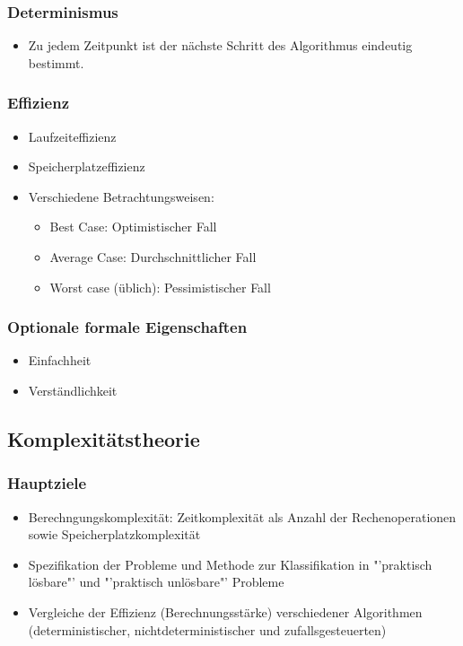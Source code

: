 \subsubsection{Determinismus}
    \begin{itemize}
	    \item Zu jedem Zeitpunkt ist der nächste Schritt des Algorithmus eindeutig bestimmt.
    \end{itemize}
\subsubsection{Effizienz}
    \begin{itemize}
	    \item Laufzeiteffizienz
	    \item Speicherplatzeffizienz
	    \item Verschiedene Betrachtungsweisen:
	    \begin{itemize}
	        \item Best Case: Optimistischer Fall
	        \item Average Case: Durchschnittlicher Fall
	        \item Worst case (üblich): Pessimistischer Fall
	    \end{itemize}
    \end{itemize}
\subsubsection{Optionale formale Eigenschaften}
    \begin{itemize}
	    \item Einfachheit
	    \item Verständlichkeit
    \end{itemize}


\subsection{Komplexitätstheorie}
\subsubsection{Hauptziele}
    \begin{itemize}
        \item Berechngungskomplexität: Zeitkomplexität als Anzahl der Rechenoperationen sowie Speicherplatzkomplexität
        \item Spezifikation der Probleme und Methode zur Klassifikation in "'praktisch lösbare"' und "'praktisch unlösbare"' Probleme
        \item Vergleiche der Effizienz (Berechnungsstärke) verschiedener Algorithmen (deterministischer, nichtdeterministischer und zufallsgesteuerten)
    \end{itemize}
